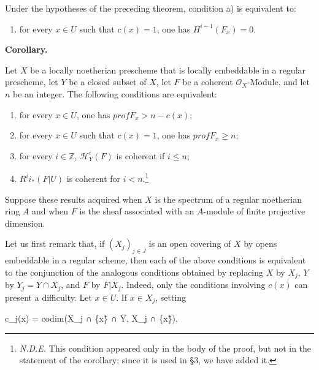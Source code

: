\documentclass[
]{article}
\newenvironment{Shaded}{}{}
\newcommand{\NormalTok}[1]{#1}
\providecommand{\tightlist}{%
  \setlength{\itemsep}{0pt}\setlength{\parskip}{0pt}}
\begin{document}
Under the hypotheses of the preceding theorem, condition a) is
equivalent to:

\begin{enumerate}
\def\labelenumi{\alph{enumi})}
\setcounter{enumi}{2}
\tightlist
\item
  for every \(x \in U\) such that \(c(x) = 1\), one has
  \(H^{i-1}(F_{x}) = 0\).
\end{enumerate}

\textbf{Corollary.}

Let \(X\) be a locally noetherian prescheme that is locally embeddable
in a regular prescheme, let \(Y\) be a closed subset of \(X\), let \(F\)
be a coherent \(\mathcal{O}_{X}\)-Module, and let \(n\) be an integer.
The following conditions are equivalent:

\begin{enumerate}
\def\labelenumi{(\roman{enumi})}
\item
  for every \(x \in U\), one has \(prof F_{x} > n - c(x)\);
\item
  for every \(x \in U\) such that \(c(x) = 1\), one has
  \(prof F_{x} \geqslant n\);
\item
  for every \(i \in \mathbb{Z}\), \(\mathcal{H}^{i}_{Y}(F)\) is coherent
  if \(i \leqslant n\);
\item
  \(R^{i} i_{*}(F|U)\) is coherent for \(i < n\).\footnote{\emph{N.D.E.}
    This condition appeared only in the body of the proof, but not in
    the statement of the corollary; since it is used in §3, we have
    added it.}
\end{enumerate}

Suppose these results acquired when \(X\) is the spectrum of a regular
noetherian ring \(A\) and when \(F\) is the sheaf associated with an
\(A\)-module of finite projective dimension.

Let us first remark that, if \((X_{j})_{j \in J}\) is an open covering
of \(X\) by opens embeddable in a regular scheme, then each of the above
conditions is equivalent to the conjunction of the analogous conditions
obtained by replacing \(X\) by \(X_{j}\), \(Y\) by
\(Y_{j} = Y \cap X_{j}\), and \(F\) by \(F|X_{j}\). Indeed, only the
conditions involving \(c(x)\) can present a difficulty. Let \(x \in U\).
If \(x \in X_{j}\), setting

\begin{Shaded}
\begin{Highlighting}[]
\NormalTok{c\_j(x) = codim(X\_j ∩ \{x\}̄ ∩ Y, X\_j ∩ \{x\}̄),}
\end{Highlighting}
\end{Shaded}
\end{document}
